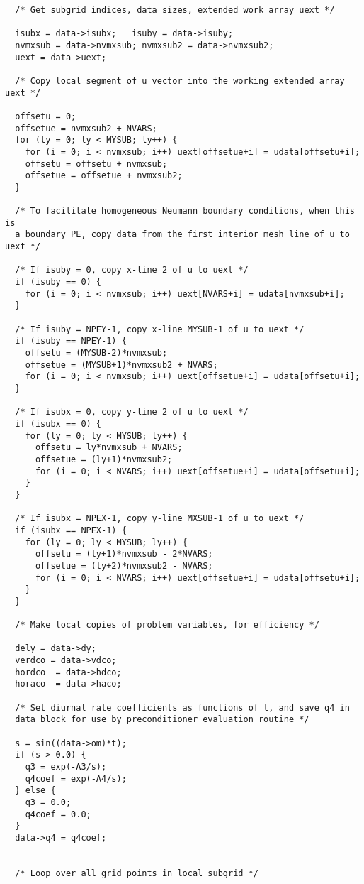 \begin{verbatim}
  /* Get subgrid indices, data sizes, extended work array uext */

  isubx = data->isubx;   isuby = data->isuby;
  nvmxsub = data->nvmxsub; nvmxsub2 = data->nvmxsub2;
  uext = data->uext;

  /* Copy local segment of u vector into the working extended array uext */

  offsetu = 0;
  offsetue = nvmxsub2 + NVARS;
  for (ly = 0; ly < MYSUB; ly++) {
    for (i = 0; i < nvmxsub; i++) uext[offsetue+i] = udata[offsetu+i];
    offsetu = offsetu + nvmxsub;
    offsetue = offsetue + nvmxsub2;
  }

  /* To facilitate homogeneous Neumann boundary conditions, when this is
  a boundary PE, copy data from the first interior mesh line of u to uext */

  /* If isuby = 0, copy x-line 2 of u to uext */
  if (isuby == 0) {
    for (i = 0; i < nvmxsub; i++) uext[NVARS+i] = udata[nvmxsub+i];
  }

  /* If isuby = NPEY-1, copy x-line MYSUB-1 of u to uext */
  if (isuby == NPEY-1) {
    offsetu = (MYSUB-2)*nvmxsub;
    offsetue = (MYSUB+1)*nvmxsub2 + NVARS;
    for (i = 0; i < nvmxsub; i++) uext[offsetue+i] = udata[offsetu+i];
  }

  /* If isubx = 0, copy y-line 2 of u to uext */
  if (isubx == 0) {
    for (ly = 0; ly < MYSUB; ly++) {
      offsetu = ly*nvmxsub + NVARS;
      offsetue = (ly+1)*nvmxsub2;
      for (i = 0; i < NVARS; i++) uext[offsetue+i] = udata[offsetu+i];
    }
  }

  /* If isubx = NPEX-1, copy y-line MXSUB-1 of u to uext */
  if (isubx == NPEX-1) {
    for (ly = 0; ly < MYSUB; ly++) {
      offsetu = (ly+1)*nvmxsub - 2*NVARS;
      offsetue = (ly+2)*nvmxsub2 - NVARS;
      for (i = 0; i < NVARS; i++) uext[offsetue+i] = udata[offsetu+i];
    }
  }

  /* Make local copies of problem variables, for efficiency */

  dely = data->dy;
  verdco = data->vdco;
  hordco  = data->hdco;
  horaco  = data->haco;

  /* Set diurnal rate coefficients as functions of t, and save q4 in 
  data block for use by preconditioner evaluation routine */

  s = sin((data->om)*t);
  if (s > 0.0) {
    q3 = exp(-A3/s);
    q4coef = exp(-A4/s);
  } else {
    q3 = 0.0;
    q4coef = 0.0;
  }
  data->q4 = q4coef;


  /* Loop over all grid points in local subgrid */


\end{verbatim}
